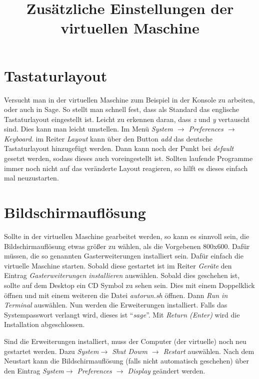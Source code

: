 \documentclass[a4paper,10pt]{article}
\title{Zusätzliche Einstellungen der virtuellen Maschine}
\begin{document}
\maketitle
\section{Tastaturlayout}
Versucht man in der virtuellen Maschine zum Beispiel in der Konsole zu arbeiten, oder auch in Sage. So stellt man schnell fest, 
dass als Standard das englische Tastaturlayout eingestellt ist. Leicht zu erkennen daran, dass \emph{z} und \emph{y} vertauscht sind.
Dies kann man leicht umstellen. Im Menü \emph{System $\rightarrow$ Preferences $\rightarrow$ Keyboard}. im Reiter \emph{Layout} kann 
über den Button \emph{add} das deutsche Tastaturlayout hinzugefügt werden. Dann kann noch der Punkt bei \emph{default} gesetzt werden,
sodass dieses auch voreingestellt ist. Sollten laufende Programme immer noch nicht auf das veränderte Layout reagieren, so hilft es 
dieses einfach mal neuzustarten. 
\section{Bildschirmauflösung}
Sollte in der virtuellen Maschine gearbeitet werden, so kann es sinnvoll sein, die Bildschirmauflösung etwas größer zu wählen, als
die Vorgebenen 800x600. Dafür müssen, die so genannten Gasterweiterungen installiert sein. Dafür einfach die virtuelle Maschine
starten. Sobald diese gestartet ist im Reiter \emph{Geräte} den Eintrag \emph{Gasterweiterungen installieren} auswählen.
Sobald dies geschehen ist, sollte auf dem Desktop ein CD Symbol zu sehen sein. Dies mit einem Doppelklick öffnen und mit einem weiteren
die Datei \emph{autorun.sh} öffnen. Dann \emph{Run in Terminal} auswählen. Nun werden die Erweiterungen installiert. Falls das 
Systempasswort verlangt wird, dieses ist \textquotedblleft\emph{sage}\textquotedblright. Mit \emph{Return (Enter)} wird die Installation abgeschlossen.

Sind die Erweiterungen installiert, muss der Computer (der virtuelle) noch neu gestartet werden. Dazu 
\emph{System$\rightarrow$ Shut Dowm $\rightarrow$ Restart}
auswählen. Nach dem Neustart kann die Bildschirmauflösung (falls nicht automatisch geschehen) über den Eintrag 
\emph{System$\rightarrow$ Preferences $\rightarrow$ Display} geändert werden. 
\end{document}

